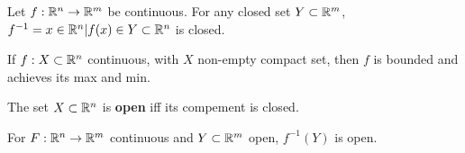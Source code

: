 \begin{proposition}
	Let $f: \mathbb{R}^n \to \mathbb{R}^m$ be continuous.
	For any closed set $Y \subset \mathbb{R}^m$, $f^{-1} = {x\in \mathbb{R}^n | f(x) \in Y} \subset \mathbb{R}^n$ is closed.
\end{proposition}

\begin{theorem}
	If $f: X \subset \mathbb{R}^n$ continuous, with $X$ non-empty compact set, then $f$ is bounded and achieves its max and min.
\end{theorem}

\begin{proposition}
	The set $X \subset \mathbb{R}^n$ is \textbf{open} iff its compement is closed.
\end{proposition}

\begin{corollary}
	For $F: \mathbb{R}^n \to \mathbb{R}^m$ continuous and $Y \subset \mathbb{R}^m$ open, $f^{-1}(Y)$ is open.
\end{corollary}
